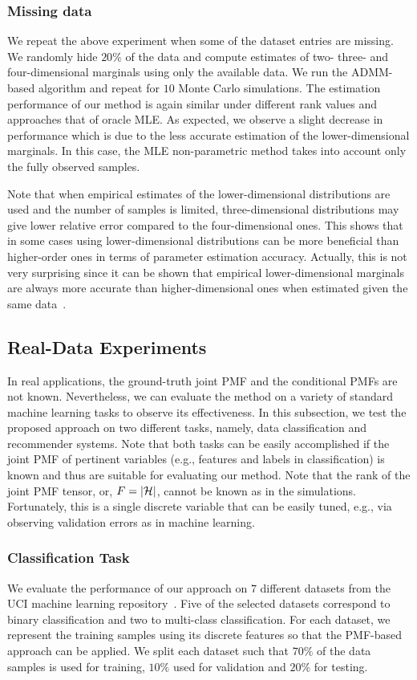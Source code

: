 \documentclass[journal]{IEEEtran}
\begin{document}
\subsubsection{Missing data}
We repeat the above experiment when some of the dataset entries are missing. We randomly hide $20\%$ of the data and compute estimates of  {two- three- and four-dimensional} marginals using only the available data. We run the ADMM-based algorithm and repeat for $10$ Monte Carlo simulations. The estimation performance of our method is again similar under different rank values and approaches that of oracle MLE. As expected, we observe a slight decrease in performance which is due to the less accurate estimation of the  {lower-dimensional} marginals. In this case, the MLE non-parametric method takes into account only the fully observed samples. 

 {Note that when empirical estimates of the lower-dimensional distributions are used and the number of samples is limited, three-dimensional distributions may give lower relative error compared to the four-dimensional ones. This shows that in some cases using lower-dimensional distributions can be more beneficial than higher-order ones in terms of parameter estimation accuracy. Actually, this is not very surprising since it can be shown that empirical lower-dimensional marginals are always more accurate than higher-dimensional ones when estimated given the same data~\cite{Huang2018}.}


\subsection{Real-Data Experiments}
In real applications, the ground-truth joint PMF and the conditional PMFs are not known. Nevertheless, we can evaluate the method on a variety of standard machine learning tasks to observe its effectiveness. 
In this subsection, we test the proposed approach on two different tasks, namely, data classification and recommender systems.
Note that both tasks can be easily accomplished if the joint PMF of pertinent variables (e.g., features and labels in classification) is known and thus are suitable for evaluating our method.
Note that the rank of the joint PMF tensor, or, $F=|{\cal H}|$, cannot be known as in the simulations. Fortunately, this is a single discrete variable that can be easily tuned, e.g., via observing validation errors as in machine learning.

\subsubsection{Classification Task}
We evaluate the performance of our approach on $7$ different datasets from the UCI machine learning repository~\cite{UCI}. Five of the selected datasets correspond to binary classification and two to multi-class classification. {For each dataset, we represent the training samples using its discrete features so that the PMF-based approach can be applied}. We split each dataset such that $70\%$ of the data samples is used for training, $10\%$ used for validation and $20\%$ for testing. 
\end{document}
